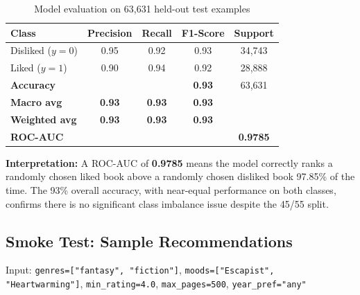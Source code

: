 \documentclass[12pt, a4paper]{article}
\newcommand{\code}[1]{\texttt{\small\color{shelfPurple}#1}}
\begin{document}
\begin{table}[H]
\centering
\caption{Model evaluation on 63{,}631 held-out test examples}
\begin{tabular}{@{}lcccc@{}}
\toprule
\textbf{Class} & \textbf{Precision} & \textbf{Recall} & \textbf{F1-Score} & \textbf{Support} \\
\midrule
Disliked ($y=0$) & 0.95 & 0.92 & 0.93 & 34{,}743 \\
Liked ($y=1$)    & 0.90 & 0.94 & 0.92 & 28{,}888 \\
\midrule
\textbf{Accuracy} & & & \textbf{0.93} & 63{,}631 \\
\textbf{Macro avg} & \textbf{0.93} & \textbf{0.93} & \textbf{0.93} & \\
\textbf{Weighted avg} & \textbf{0.93} & \textbf{0.93} & \textbf{0.93} & \\
\midrule
\multicolumn{4}{l}{\textbf{ROC-AUC}} & \textbf{0.9785} \\
\bottomrule
\end{tabular}
\end{table}

\begin{insightbox}
\textbf{Interpretation:} A ROC-AUC of \textbf{0.9785} means the model correctly
ranks a randomly chosen liked book above a randomly chosen disliked book 97.85\%
of the time. The 93\% overall accuracy, with near-equal performance on both classes,
confirms there is no significant class imbalance issue despite the 45/55 split.
\end{insightbox}

\subsection{Smoke Test: Sample Recommendations}

Input: \code{genres=["fantasy", "fiction"]}, \code{moods=["Escapist", "Heartwarming"]},
\code{min\_rating=4.0}, \code{max\_pages=500}, \code{year\_pref="any"}
\end{document}
